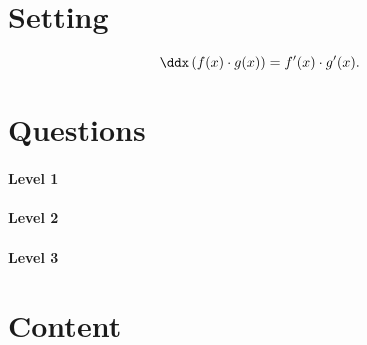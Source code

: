 \documentclass{ximera}
\begin{document}
\section{Setting}

\vfil

\[
\ddx\left(f(x) \cdot g(x)\right) = f'(x)\cdot g'(x).
\]

\vfil

\vfil

\newpage


\section{Questions}

\paragraph{Level 1}

\paragraph{Level 2}

\paragraph{Level 3}


\section{Content}
\end{document}
